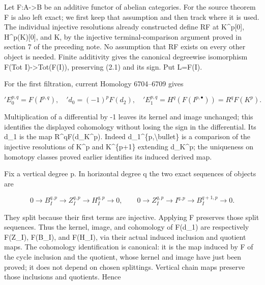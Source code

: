Let F:\allowbreak{}A\allowbreak{}->B be an additive functor of abelian categories. For the source theorem F is also left exact; we first keep that assumption and then track where it is used. The individual injective resolutions already constructed define RF at K\textasciicircum{}p[0]\allowbreak{},\allowbreak{} H\textasciicircum{}p(K)\allowbreak{}[0]\allowbreak{},\allowbreak{} and K,\allowbreak{} by the injective terminal-comparison argument proved in section 7 of the preceding note. No assumption that RF exists on every other object is needed. Finite additivity gives the canonical degreewise isomorphism F(Tot I)\allowbreak{}\allowbreak{}->Tot(F(I)\allowbreak{})\allowbreak{},\allowbreak{} preserving (2.1)\allowbreak{} and its sign. Put L\allowbreak{}=F(I)\allowbreak{}.

For the first filtration,\allowbreak{} current Homology 6704–\allowbreak{}6709 gives

\[
 {}'E_0^{p,q}=F(I^{p,q}),\quad {}'d_0=(-1)^p F(d_2),\quad
 {}'E_1^{p,q}=H^q(F(I^{p,\bullet}))=R^qF(K^p).                  \tag{2.2}
\]

Multiplication of a differential by -1 leaves its kernel and image unchanged; this identifies the displayed cohomology without losing the sign in the differential. Its d\_\allowbreak{}1 is the map R\textasciicircum{}qF(d\_\allowbreak{}K\textasciicircum{}p)\allowbreak{}. Indeed d\_\allowbreak{}1\textasciicircum{}\{p,\allowbreak{}\textbackslash{}bullet\} is a comparison of the injective resolutions of K\^{}p and K\textasciicircum{}\{p\allowbreak{}+1\} extending d\_\allowbreak{}K\textasciicircum{}p; the uniqueness on homotopy classes proved earlier identifies its induced derived map.

Fix a vertical degree p. In horizontal degree q the two exact sequences of objects are

\[
 0\to B_I^{q,p}\to Z_I^{q,p}\to H_I^{q,p}\to0,\qquad
 0\to Z_I^{q,p}\to I^{q,p}\to B_I^{q+1,p}\to0.                 \tag{2.3}
\]

They split because their first terms are injective. Applying F preserves those split sequences. Thus the kernel,\allowbreak{} image,\allowbreak{} and cohomology of F(d\_\allowbreak{}1)\allowbreak{} are respectively F(Z\_\allowbreak{}I)\allowbreak{},\allowbreak{} F(B\_\allowbreak{}I)\allowbreak{},\allowbreak{} and F(H\_\allowbreak{}I)\allowbreak{},\allowbreak{} via their actual induced inclusion and quotient maps. The cohomology identification is canonical:\allowbreak{} it is the map induced by F of the cycle inclusion and the quotient,\allowbreak{} whose kernel and image have just been proved; it does not depend on chosen splittings. Vertical chain maps preserve those inclusions and quotients. Hence

